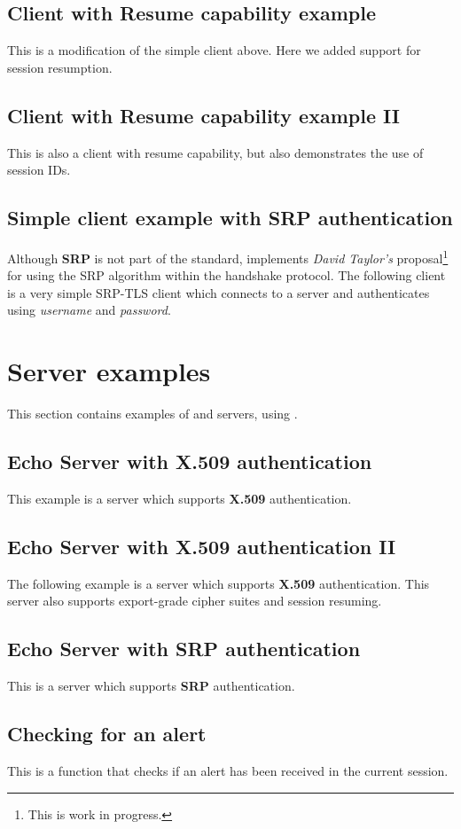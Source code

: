

\subsection{Client with Resume capability example}
\label{resume-example}
This is a modification of the simple client above. Here we added support 
for session resumption.


\subsection{Client with Resume capability example II}
\label{resume-example2}
This is also a client with resume capability, but also demonstrates
the use of session IDs.


\subsection{Simple client example with SRP authentication}
Although {\bf SRP} is not part of the \tls{} standard, \gnutls{} implements
{\it David Taylor's} proposal\footnote{This is work in progress.}  for using the SRP algorithm
within the \tls{} handshake protocol. The following client
is a very simple SRP-TLS client which connects to a server 
and authenticates using {\it username} and {\it password}.



\section{Server examples}
This section contains examples of \tls{} and \ssl{} servers, using \gnutls{}.

\subsection{Echo Server with X.509 authentication}
This example is a server which supports {\bf X.509} authentication.


\subsection{Echo Server with X.509 authentication II}
The following example is a server which supports {\bf X.509} authentication.
This server also supports export-grade cipher suites and session resuming.


\subsection{Echo Server with SRP authentication}
This is a server which supports {\bf SRP} authentication.


\subsection{Checking for an alert}
This is a function that checks if an alert has been received
in the current session.



